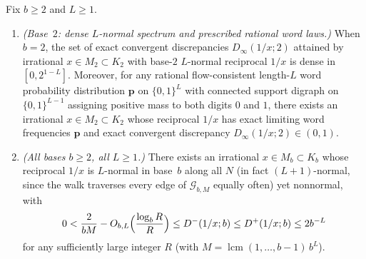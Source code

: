 \documentclass[11pt]{article}
\DeclareMathOperator{\lcm}{lcm}
\begin{document}
\begin{theorem}\label{thm:Lnormal-reciprocals}
Fix $b\ge2$ and $L\ge1$.
\begin{enumerate}[label=\textup{(\roman*)},nosep]
\item \emph{(Base~$2$: dense $L$-normal spectrum and prescribed rational word laws.)} When $b=2$, the set of exact convergent discrepancies $D_\infty(1/x;2)$ attained by irrational $x\in M_2\subset K_2$ with base-$2$ $L$-normal reciprocal $1/x$ is dense in $[0,2^{1-L}]$. Moreover, for any rational flow-consistent length-$L$ word probability distribution $\mathbf p$ on $\{0,1\}^L$ with connected support digraph on $\{0,1\}^{L-1}$ assigning positive mass to both digits $0$ and $1$, there exists an irrational $x\in M_2\subset K_2$ whose reciprocal $1/x$ has exact limiting word frequencies $\mathbf p$ and exact convergent discrepancy $D_\infty(1/x;2)\in(0,1)$.
\item \emph{(All bases $b\ge2$, all $L\ge1$.)} There exists an irrational $x\in M_b\subset K_b$ whose reciprocal $1/x$ is $L$-normal in base~$b$ along all $N$ (in fact $(L+1)$-normal, since the walk traverses every edge of $\mathcal G_{b,M}$ equally often) yet nonnormal, with
\[
0<\frac{2}{bM}-O_{b,L}\Bigl(\frac{\log_b R}{R}\Bigr)\le D^-(1/x;b)\le D^+(1/x;b)\le 2b^{-L}
\]
for any sufficiently large integer $R$ (with $M=\lcm(1,\dots,b-1)\,b^L$).
\end{enumerate}
\end{theorem}
\end{document}
